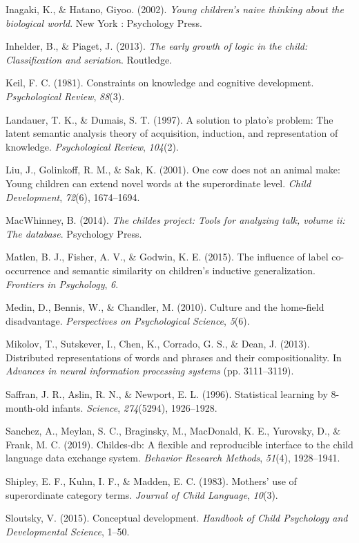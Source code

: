 \documentclass[english,,man,floatsintext]{apa6}
\begin{document}
\leavevmode\hypertarget{ref-inagaki2002}{}%
Inagaki, K., \& Hatano, Giyoo. (2002). \emph{Young children's naive thinking about the biological world}. New York : Psychology Press.

\leavevmode\hypertarget{ref-inhelder2013}{}%
Inhelder, B., \& Piaget, J. (2013). \emph{The early growth of logic in the child: Classification and seriation}. Routledge.

\leavevmode\hypertarget{ref-keil1981}{}%
Keil, F. C. (1981). Constraints on knowledge and cognitive development. \emph{Psychological Review}, \emph{88}(3).

\leavevmode\hypertarget{ref-landauer1997}{}%
Landauer, T. K., \& Dumais, S. T. (1997). A solution to plato's problem: The latent semantic analysis theory of acquisition, induction, and representation of knowledge. \emph{Psychological Review}, \emph{104}(2).

\leavevmode\hypertarget{ref-liu2001}{}%
Liu, J., Golinkoff, R. M., \& Sak, K. (2001). One cow does not an animal make: Young children can extend novel words at the superordinate level. \emph{Child Development}, \emph{72}(6), 1674--1694.

\leavevmode\hypertarget{ref-macwhinney2014}{}%
MacWhinney, B. (2014). \emph{The childes project: Tools for analyzing talk, volume ii: The database}. Psychology Press.

\leavevmode\hypertarget{ref-matlen2015}{}%
Matlen, B. J., Fisher, A. V., \& Godwin, K. E. (2015). The influence of label co-occurrence and semantic similarity on children's inductive generalization. \emph{Frontiers in Psychology}, \emph{6}.

\leavevmode\hypertarget{ref-medin2010}{}%
Medin, D., Bennis, W., \& Chandler, M. (2010). Culture and the home-field disadvantage. \emph{Perspectives on Psychological Science}, \emph{5}(6).

\leavevmode\hypertarget{ref-mikolov2013}{}%
Mikolov, T., Sutskever, I., Chen, K., Corrado, G. S., \& Dean, J. (2013). Distributed representations of words and phrases and their compositionality. In \emph{Advances in neural information processing systems} (pp. 3111--3119).

\leavevmode\hypertarget{ref-saffran1996}{}%
Saffran, J. R., Aslin, R. N., \& Newport, E. L. (1996). Statistical learning by 8-month-old infants. \emph{Science}, \emph{274}(5294), 1926--1928.

\leavevmode\hypertarget{ref-sanchez2019}{}%
Sanchez, A., Meylan, S. C., Braginsky, M., MacDonald, K. E., Yurovsky, D., \& Frank, M. C. (2019). Childes-db: A flexible and reproducible interface to the child language data exchange system. \emph{Behavior Research Methods}, \emph{51}(4), 1928--1941.

\leavevmode\hypertarget{ref-shipley1983}{}%
Shipley, E. F., Kuhn, I. F., \& Madden, E. C. (1983). Mothers' use of superordinate category terms. \emph{Journal of Child Language}, \emph{10}(3).

\leavevmode\hypertarget{ref-sloutsky2015}{}%
Sloutsky, V. (2015). Conceptual development. \emph{Handbook of Child Psychology and Developmental Science}, 1--50.
\end{document}
